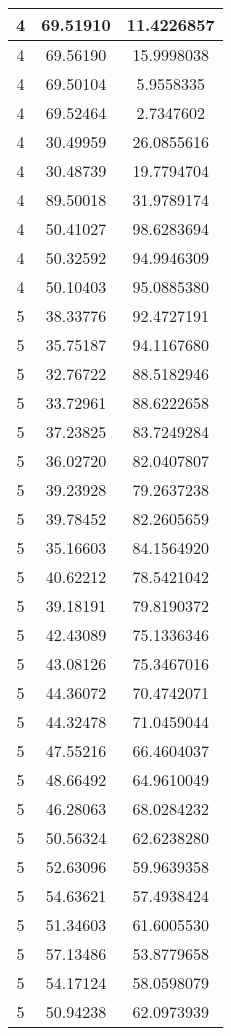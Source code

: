 \documentclass[
]{book}
\begin{document}
\begin{tabular}{c|c|c}
\hline
4 & 69.51910 & 11.4226857\\
\hline
4 & 69.56190 & 15.9998038\\
\hline
4 & 69.50104 & 5.9558335\\
\hline
4 & 69.52464 & 2.7347602\\
\hline
4 & 30.49959 & 26.0855616\\
\hline
4 & 30.48739 & 19.7794704\\
\hline
4 & 89.50018 & 31.9789174\\
\hline
4 & 50.41027 & 98.6283694\\
\hline
4 & 50.32592 & 94.9946309\\
\hline
4 & 50.10403 & 95.0885380\\
\hline
5 & 38.33776 & 92.4727191\\
\hline
5 & 35.75187 & 94.1167680\\
\hline
5 & 32.76722 & 88.5182946\\
\hline
5 & 33.72961 & 88.6222658\\
\hline
5 & 37.23825 & 83.7249284\\
\hline
5 & 36.02720 & 82.0407807\\
\hline
5 & 39.23928 & 79.2637238\\
\hline
5 & 39.78452 & 82.2605659\\
\hline
5 & 35.16603 & 84.1564920\\
\hline
5 & 40.62212 & 78.5421042\\
\hline
5 & 39.18191 & 79.8190372\\
\hline
5 & 42.43089 & 75.1336346\\
\hline
5 & 43.08126 & 75.3467016\\
\hline
5 & 44.36072 & 70.4742071\\
\hline
5 & 44.32478 & 71.0459044\\
\hline
5 & 47.55216 & 66.4604037\\
\hline
5 & 48.66492 & 64.9610049\\
\hline
5 & 46.28063 & 68.0284232\\
\hline
5 & 50.56324 & 62.6238280\\
\hline
5 & 52.63096 & 59.9639358\\
\hline
5 & 54.63621 & 57.4938424\\
\hline
5 & 51.34603 & 61.6005530\\
\hline
5 & 57.13486 & 53.8779658\\
\hline
5 & 54.17124 & 58.0598079\\
\hline
5 & 50.94238 & 62.0973939\\

\end{tabular}
\end{document}
